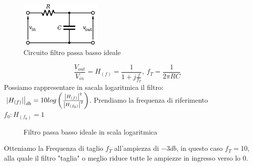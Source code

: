             \begin{figure}[H]
                \centering
                \includegraphics[width=4cm]{media/1st_Order_Lowpass_Filter_RC.png}
                \caption{Circuito filtro passa basso ideale}
                \label{fig:circuito filtro passa basso ideale}
            \end{figure}
            \[
                \frac{V_{out}}{V_{in}} = H_{(f)} = \frac{1}{1+j\frac{f}{f_T}},\ f_T = \frac{1}{2\pi RC}
            \] 
            Possiamo rappresentare in sacala logaritmica il filtro: $\eval*{|H_{(f)}|}_{db} = 10log\left( \frac{\left|H_{(f)}\right|^2}{\left|H_{(f_0)}\right|^2} \right)$.
            Prendiamo la frequenza di riferimento $f_0: H_{(f_0)} = 1$
            \begin{figure}[H]
                \centering
                \caption{Filtro passa basso ideale in scala logaritmica}
                \label{fig:LP filter logartithm}
            \end{figure} 
            
            Otteniamo la Frequenza di taglio $f_T$ all'ampiezza di $-3db$, in questo caso $f_T = 10$, alla quale
            il filtro "taglia" o meglio riduce tutte le ampiezze in ingresso verso lo 0.

